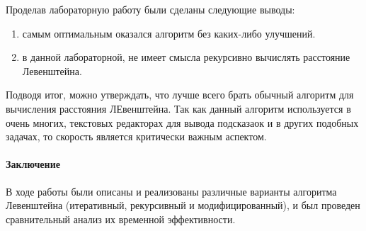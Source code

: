 \documentclass[utf8x, 12pt]{G7-32} %
\begin{document}
Проделав лабораторную работу были сделаны следующие выводы:
\begin{enumerate}
	\item самым оптимальным оказался алгоритм без каких-либо улучшений.
	\item в данной лабораторной, не имеет смысла рекурсивно вычислять расстояние Левенштейна.
\end{enumerate}
Подводя итог, можно утверждать, что лучше всего брать обычный алгоритм для вычисления расстояния ЛЕвенштейна. Так как данный алгоритм используется в очень многих, текстовых редакторах для вывода подсказаок и в других подобных задачах, то скорость является критически важным аспектом.

\paragraph{Заключение}

В ходе работы были описаны и реализованы различные варианты алгоритма Левенштейна (итеративный, рекурсивный и модифицированный), и был проведен сравнительный анализ их временной эффективности.

\backmatter %

\appendix   %
\end{document}
